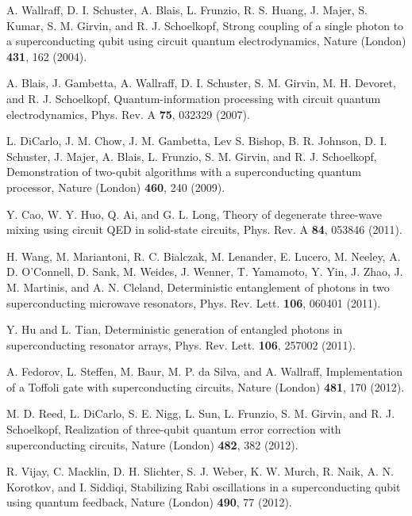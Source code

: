 \documentclass[showpacs,aps,graphicx,twocolumn]{revtex4}
\begin{document}
\begin{thebibliography}{1}
 A. Wallraff, D. I. Schuster, A. Blais, L. Frunzio,
R. S. Huang, J. Majer, S. Kumar, S. M. Girvin, and R. J. Schoelkopf,
Strong coupling of a single photon to a superconducting qubit using
circuit quantum electrodynamics, Nature (London) \textbf{431}, 162 (2004).




 A. Blais, J. Gambetta, A. Wallraff, D. I. Schuster,
S. M. Girvin, M. H. Devoret, and R. J. Schoelkopf, Quantum-information
processing with circuit quantum electrodynamics, Phys. Rev. A \textbf{75}, 032329 (2007).


 L. DiCarlo, J. M. Chow, J. M. Gambetta, Lev S. Bishop,
B. R. Johnson, D. I. Schuster, J. Majer, A. Blais, L. Frunzio, S. M. Girvin,
and  R. J. Schoelkopf, Demonstration of two-qubit algorithms with
a superconducting quantum processor, Nature (London) \textbf{460}, 240 (2009).


 Y. Cao, W. Y. Huo, Q. Ai, and G. L. Long,
Theory of degenerate three-wave mixing using circuit QED in solid-state circuits,
Phys. Rev. A \textbf{84}, 053846 (2011).



 H. Wang, M. Mariantoni, R. C. Bialczak,
M. Lenander, E. Lucero, M. Neeley, A. D. O'Connell, D. Sank, M. Weides,
J. Wenner, T. Yamamoto, Y. Yin, J. Zhao, J. M. Martinis, and A. N. Cleland,
Deterministic entanglement of photons in two superconducting microwave resonators,
Phys. Rev. Lett. \textbf{106}, 060401 (2011).


 Y. Hu and L. Tian,
Deterministic generation of entangled photons in superconducting resonator arrays,
Phys. Rev. Lett. \textbf{106}, 257002 (2011).


 A. Fedorov, L. Steffen, M. Baur, M. P. da Silva, and A. Wallraff,
Implementation of a Toffoli gate with superconducting circuits,
Nature (London) \textbf{481}, 170 (2012).


 M. D. Reed, L. DiCarlo, S. E. Nigg, L. Sun, L. Frunzio,
S. M. Girvin, and R. J. Schoelkopf, Realization of three-qubit
quantum error correction with superconducting circuits, Nature  (London) \textbf{482}, 382 (2012).


 R. Vijay, C. Macklin, D. H. Slichter, S. J. Weber, K. W. Murch, R. Naik, A. N. Korotkov, and I. Siddiqi, Stabilizing Rabi oscillations in a superconducting qubit using quantum feedback, Nature (London) \textbf{490}, 77 (2012).



\end{thebibliography}
\end{document}

